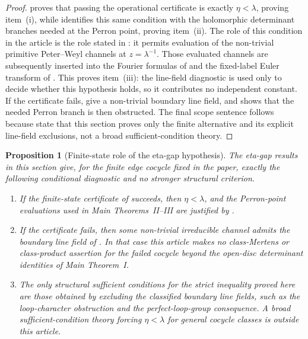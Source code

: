 \documentclass[11pt,a4paper]{amsart}
\theoremstyle{plain}
\newtheorem{proposition}[theorem]{Proposition}
\theoremstyle{definition}
\theoremstyle{remark}
\begin{document}
\begin{proof}
   proves that passing the
  operational certificate is exactly \(\eta<\lambda\), proving item~(i), while
   identifies this same condition with
  the holomorphic determinant branches needed at the Perron point, proving
  item~(ii). The role of this condition in the article is the role stated in
  : it
  permits evaluation of the non-trivial primitive Peter--Weyl channels at
  \(z=\lambda^{-1}\). Those evaluated channels are subsequently inserted
  into the Fourier formulas of
   and the
  fixed-label Euler transform of
  .
  This proves item~(iii): the line-field diagnostic is used only to decide
  whether this hypothesis holds, so it contributes no independent constant.
  If the certificate fails,
   give a
  non-trivial boundary line field, and
   shows that the needed Perron branch is
  then obstructed.  The final scope sentence follows because
   state
  that this section proves only the finite alternative and its explicit
  line-field exclusions, not a broad sufficient-condition theory.
\end{proof}

\begin{proposition}[Finite-state role of the eta-gap hypothesis]
  \label{prop:eta-gap-conditional-scope}
  The eta-gap results in this section give, for the finite edge cocycle fixed
  in the paper, exactly the following conditional diagnostic and no stronger
  structural criterion.
  \begin{enumerate}[label=\textup{(\roman*)},leftmargin=*]
    \item If the finite-state certificate of
       succeeds, then
      \(\eta<\lambda\), and the Perron-point evaluations used in Main
      Theorems~II--III are justified by
      .
    \item If the certificate fails, then some non-trivial irreducible channel
      admits the boundary line field of .  In that
      case this article makes no class-Mertens or class-product assertion for
      the failed cocycle beyond the open-disc determinant identities of Main
      Theorem~I.
    \item The only structural sufficient conditions for the strict inequality
      proved here are those obtained by excluding the classified boundary line
      fields, such as the loop-character obstruction and the perfect-loop-group
      consequence.  A broad sufficient-condition theory forcing
      \(\eta<\lambda\) for general cocycle classes is outside this article.
  \end{enumerate}
\end{proposition}
\end{document}
